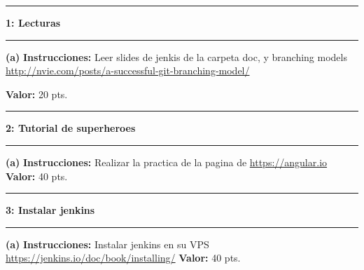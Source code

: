 \documentclass[11pt]{article}
\newcommand\question[2]{\vspace{.25in}\hrule\textbf{#1: #2}\vspace{.5em}\hrule\vspace{.10in}}
\renewcommand\part[1]{\vspace{.10in}\textbf{(#1)}}
\newcommand\algorithm{\vspace{.10in}\textbf{Instrucciones: }}
\newcommand\correctness{\vspace{.10in}\textbf{Valor: }}
\begin{document}
\raggedright

\newcommand\NAME{Adolfo Centeno}  
\newcommand\ADSOFTID{adsoft}     
\newcommand\HWNUM{7}              

\question{1}{Lecturas} 

\part{a} \algorithm  Leer slides de jenkis de la carpeta doc, y branching models \url{http://nvie.com/posts/a-successful-git-branching-model/}

\correctness 20 pts.


\question{2}{Tutorial de superheroes} 

\part{a} \algorithm  Realizar la practica de la pagina de \url{https://angular.io}
\correctness 40 pts.

\question{3}{Instalar jenkins} 

\part{a} \algorithm  Instalar jenkins en su VPS \url{https://jenkins.io/doc/book/installing/}
\correctness 40 pts.
\end{document}
